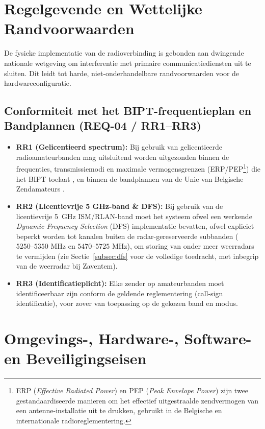 \section{Regelgevende en Wettelijke Randvoorwaarden}
\label{sec:req-wettelijk}

De fysieke implementatie van de radioverbinding is gebonden aan dwingende nationale wetgeving om interferentie met primaire communicatiediensten uit te sluiten. Dit leidt tot harde, niet-onderhandelbare randvoorwaarden voor de hardwareconfiguratie.

\subsection{Conformiteit met het BIPT-frequentieplan en Bandplannen (REQ-04 / RR1--RR3)}
\begin{itemize}
    \item \textbf{RR1 (Gelicentieerd spectrum):} Bij gebruik van gelicentieerde radioamateurbanden mag uitsluitend worden uitgezonden binnen de frequenties, transmissiemodi en maximale vermogensgrenzen (ERP/PEP\footnote{ERP (\textit{Effective Radiated Power}) en PEP (\textit{Peak Envelope Power}) zijn twee gestandaardiseerde manieren om het effectief uitgestraalde zendvermogen van een antenne-installatie uit te drukken, gebruikt in de Belgische en internationale radioreglementering.}) die het BIPT toelaat \autocite{BIPT2019}, en binnen de bandplannen van de Unie van Belgische Zendamateurs \autocite{UBAFrequenties}.
    \item \textbf{RR2 (Licentievrije 5 GHz-band \& DFS):} Bij gebruik van de licentievrije 5~GHz ISM/RLAN-band moet het systeem ofwel een werkende \textit{Dynamic Frequency Selection} (DFS) implementatie bevatten, ofwel expliciet beperkt worden tot kanalen buiten de radar-gereserveerde subbanden ($5250\text{--}5350\text{ MHz}$ en $5470\text{--}5725\text{ MHz}$), om storing van onder meer weerradars te vermijden (zie Sectie~\ref{subsec:dfs} voor de volledige toedracht, met inbegrip van de weerradar bij Zaventem).
    \item \textbf{RR3 (Identificatieplicht):} Elke zender op amateurbanden moet identificeerbaar zijn conform de geldende reglementering (call-sign identificatie), voor zover van toepassing op de gekozen band en modus.
\end{itemize}

\section{Omgevings-, Hardware-, Software- en Beveiligingseisen}
\label{sec:randvoorwaarden-overig}

